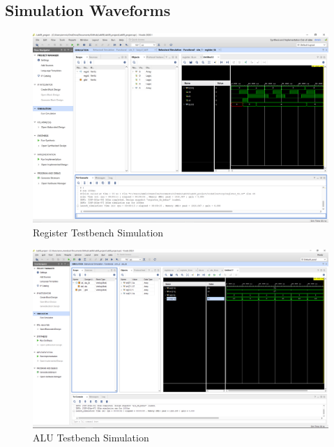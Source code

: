 \documentclass[11pt]{article}
\begin{document}
\subsection*{Simulation Waveforms}
\begin{figure}[ht]\centering
\includegraphics[width=1\textwidth,trim=19cm 15cm 0.5cm 4.5cm,clip]{register_tb_screenshot}
	\caption{Register Testbench Simulation}
	\label{fig:sim_with_table}
\end{figure}

\begin{figure}[ht]\centering
\includegraphics[width=1\textwidth,trim=19cm 15cm 0.5cm 4.5cm,clip]{alu_tb_screenshot}
	\caption{ALU Testbench Simulation}
	\label{fig:sim_with_table}
\end{figure}
\end{document}
